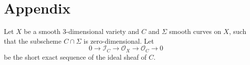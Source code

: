 \documentclass[12pt]{amsart}
\newcommand{\hide}[1]{}
\numberwithin{equation}{subsection}
\theoremstyle{plain}
\theoremstyle{definition}
\newcommand{\QQ}{{\mathbb Q}}
\newcommand{\Spin}{{\rm Spin}}
\newcommand{\StructureSheaf}[1]{{\mathcal O}_{#1}}
\newcommand{\Ideal}[1]{{\mathcal I}_{#1}}
\begin{document}
% 
\hide{

\subsection{Miscellaneous}
We get also the decomposition
\[
\wedge^2S^+_\QQ\cong \wedge^2P_w\oplus [P_w\otimes P_w^\perp]\oplus \wedge^2(P_w^\perp).
\]
Now, the line $\wedge^2P_w$ is different from the trivial $\Spin(V_\QQ)$ subrepresentation
appearing in (\ref{eq-wedge-2-S-+}) and hence project non-trivially to $\wedge^4 V_\QQ$.
The summand $\wedge^2(P_w^\perp)$ is isomorphic to its dual, which contains the restriction
of the pairing  (\ref{eq-Mukai-pairing}). Hence, it decomposes as 
\[
\wedge^2(P_w^\perp)\cong 1\oplus \wedge^2_0(P_w^\perp),
\]
where 
$\wedge^2_0(P_w^\perp)$ is the intersection $\wedge^2(P_w^\perp)\cap \wedge^4 V_\QQ$ in $\wedge^2S^+_\QQ$.
We get a decomposition
\[
\wedge^4 V_\QQ\cong 1\oplus \wedge^2_0(P_w^\perp)\oplus [P_w\otimes P_w^\perp].
\]

As a representation of the stabilizer $\Spin(V_\QQ)_w$, the space
$\wedge^6_+V_\QQ$ contains the two dimensional trivial representation $P$, such that 
$P\otimes_\QQ K=\wedge^6W_1+\wedge^6 W_2.$
}



% 
\section{Appendix}
\label{appendix}

Let $X$ be a smooth $3$-dimensional variety and $C$ and $\Sigma$ smooth curves on $X$, such that the subscheme $C\cap \Sigma$ is zero-dimensional. Let
\begin{equation}
\label{eq-short-exact-sequence-of-ideal-sheaf-of-C}
0\rightarrow \Ideal{C}\rightarrow\StructureSheaf{X}\rightarrow \StructureSheaf{C}\rightarrow 0
\end{equation}
be the short exact sequence of the ideal sheaf of $C$. 
\end{document}
